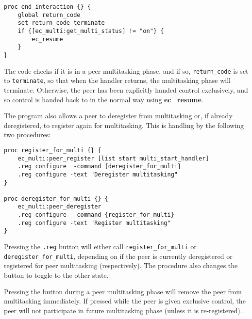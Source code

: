 \begin{verbatim}
proc end_interaction {} {
    global return_code
    set return_code terminate
    if {[ec_multi:get_multi_status] != "on"} {
        ec_resume
    }
}
\end{verbatim}

The code checks if it is in a peer multitasking phase, and if so,
{\tt return_code} is set to {\tt terminate}, so that when the handler
returns, the multitasking phase will terminate.
Otherwise, the peer has been explicitly handed control exclusively,
and so control is handed back to {\eclipse} in the normal way using {\bf
  ec_resume}.

The program also allows a peer to deregister from multitasking or, if
already deregistered, to register again for multitasking. This is handling
by the following two procedures:

\begin{verbatim}
proc register_for_multi {} {
    ec_multi:peer_register [list start multi_start_handler]
    .reg configure  -command {deregister_for_multi}
    .reg configure -text "Deregister multitasking"
}

proc deregister_for_multi {} {
    ec_multi:peer_deregister
    .reg configure  -command {register_for_multi}
    .reg configure -text "Register multitasking"
}
\end{verbatim}

\noindent
Pressing the {\tt .reg} button will either call {\tt register_for_multi} or
{\tt deregister_for_multi}, depending on if the peer is currently
deregistered or registered for peer multitasking (respectively). The
procedure also changes the button to toggle to the other state.

Pressing the button during a peer multitasking phase will remove the peer
from multitasking immediately. If pressed while the peer is given exclusive
control, the peer will not participate in future multitasking phase (unless
it is re-registered). 


 